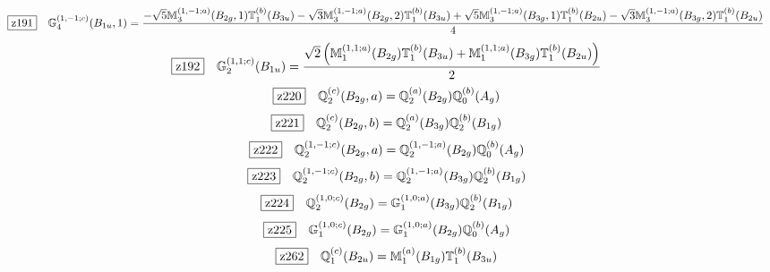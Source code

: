 \documentclass[fleqn,10pt,landscape]{jsarticle}
\begin{document}
\begin{dmath*}
\hspace*{3mm}\fbox{z191}\quad \mathbb{G}_{4}^{(1,-1;c)}(B_{1u},1)=\frac{- \sqrt{5} \mathbb{M}_{3}^{(1,-1;a)}(B_{2g},1) \mathbb{T}_{1}^{(b)}(B_{3u}) - \sqrt{3} \mathbb{M}_{3}^{(1,-1;a)}(B_{2g},2) \mathbb{T}_{1}^{(b)}(B_{3u}) + \sqrt{5} \mathbb{M}_{3}^{(1,-1;a)}(B_{3g},1) \mathbb{T}_{1}^{(b)}(B_{2u}) - \sqrt{3} \mathbb{M}_{3}^{(1,-1;a)}(B_{3g},2) \mathbb{T}_{1}^{(b)}(B_{2u})}{4}
\end{dmath*}
\begin{dmath*}
\hspace*{3mm}\fbox{z192}\quad \mathbb{G}_{2}^{(1,1;c)}(B_{1u})=\frac{\sqrt{2} \left(\mathbb{M}_{1}^{(1,1;a)}(B_{2g}) \mathbb{T}_{1}^{(b)}(B_{3u}) + \mathbb{M}_{1}^{(1,1;a)}(B_{3g}) \mathbb{T}_{1}^{(b)}(B_{2u})\right)}{2}
\end{dmath*}
\begin{dmath*}
\hspace*{3mm}\fbox{z220}\quad \mathbb{Q}_{2}^{(c)}(B_{2g},a)=\mathbb{Q}_{2}^{(a)}(B_{2g}) \mathbb{Q}_{0}^{(b)}(A_{g})
\end{dmath*}
\begin{dmath*}
\hspace*{3mm}\fbox{z221}\quad \mathbb{Q}_{2}^{(c)}(B_{2g},b)=\mathbb{Q}_{2}^{(a)}(B_{3g}) \mathbb{Q}_{2}^{(b)}(B_{1g})
\end{dmath*}
\begin{dmath*}
\hspace*{3mm}\fbox{z222}\quad \mathbb{Q}_{2}^{(1,-1;c)}(B_{2g},a)=\mathbb{Q}_{2}^{(1,-1;a)}(B_{2g}) \mathbb{Q}_{0}^{(b)}(A_{g})
\end{dmath*}
\begin{dmath*}
\hspace*{3mm}\fbox{z223}\quad \mathbb{Q}_{2}^{(1,-1;c)}(B_{2g},b)=\mathbb{Q}_{2}^{(1,-1;a)}(B_{3g}) \mathbb{Q}_{2}^{(b)}(B_{1g})
\end{dmath*}
\begin{dmath*}
\hspace*{3mm}\fbox{z224}\quad \mathbb{Q}_{2}^{(1,0;c)}(B_{2g})=\mathbb{G}_{1}^{(1,0;a)}(B_{3g}) \mathbb{Q}_{2}^{(b)}(B_{1g})
\end{dmath*}
\begin{dmath*}
\hspace*{3mm}\fbox{z225}\quad \mathbb{G}_{1}^{(1,0;c)}(B_{2g})=\mathbb{G}_{1}^{(1,0;a)}(B_{2g}) \mathbb{Q}_{0}^{(b)}(A_{g})
\end{dmath*}
\begin{dmath*}
\hspace*{3mm}\fbox{z262}\quad \mathbb{Q}_{1}^{(c)}(B_{2u})=\mathbb{M}_{1}^{(a)}(B_{1g}) \mathbb{T}_{1}^{(b)}(B_{3u})
\end{dmath*}
\end{document}
